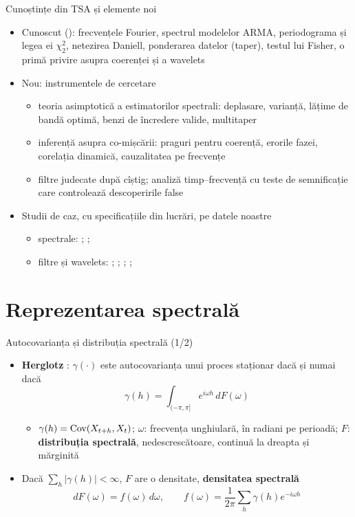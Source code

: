 \begin{frame}{Cunoștințe din TSA și elemente noi}
\itemsize{\small}
\begin{itemize}
    \item Cunoscut (): frecvențele Fourier, spectrul modelelor ARMA, periodograma și legea ei $\chi^2_2$, netezirea Daniell, ponderarea datelor (taper), testul lui Fisher, o primă privire asupra coerenței și a wavelets
    \item Nou: instrumentele de cercetare
    \begin{itemize}
        \item teoria asimptotică a estimatorilor spectrali: deplasare, varianță, lățime de bandă optimă, benzi de încredere valide, multitaper
        \item inferență asupra co-mișcării: praguri pentru coerență, erorile fazei, corelația dinamică, cauzalitatea pe frecvențe
        \item filtre judecate după cîștig; analiză timp--frecvență cu teste de semnificație care controlează descoperirile false
    \end{itemize}
    \item Studii de caz, cu specificațiile din lucrări, pe datele noastre
    \begin{itemize}
        \item spectrale: ; ; 
        \item filtre și wavelets: ; ; ; ; 
    \end{itemize}
\end{itemize}
\end{frame}


\section{Reprezentarea spectrală}

\begin{frame}{Autocovarianța și distribuția spectrală (1/2)}
\itemsize{\small}
\begin{itemize}
    \item \textbf{Herglotz} : $\gamma(\cdot)$ este autocovarianța unui proces staționar dacă și numai dacă
    \[ \gamma(h) = \int_{(-\pi, \pi]} e^{i\omega h}\,dF(\omega) \]
    \begin{itemize}
        \item $\gamma(h) = \text{Cov}(X_{t+h}, X_t)$; $\omega$: frecvența unghiulară, în radiani pe perioadă; $F$: \textbf{distribuția spectrală}, nedescrescătoare, continuă la dreapta și mărginită
    \end{itemize}
    \item Dacă $\sum_h|\gamma(h)| < \infty$, $F$ are o densitate, \textbf{densitatea spectrală}
    \[ dF(\omega) = f(\omega)\,d\omega, \qquad f(\omega) = \frac{1}{2\pi}\sum_h\gamma(h)e^{-i\omega h} \]
\end{itemize}
\end{frame}

